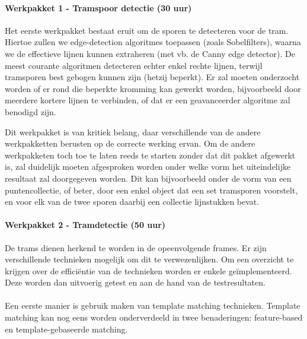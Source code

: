 \documentclass[a4paper,oneside,11pt,final]{memoir}
\begin{document}

\paragraph{Werkpakket 1 - Tramspoor detectie (30 uur)}

Het eerste werkpakket bestaat eruit om de sporen te detecteren voor de tram. Hiertoe zullen we edge-detection algoritmes toepassen (zoals Sobelfilters), waarna we de effectieve lijnen kunnen extraheren (met vb. de Canny edge detector). De meest courante algoritmen detecteren echter enkel rechte lijnen, terwijl tramsporen best gebogen kunnen zijn (hetzij beperkt). Er zal moeten onderzocht worden of er rond die beperkte kromming kan gewerkt worden, bijvoorbeeld door meerdere kortere lijnen te verbinden, of dat er een geavanceerder algoritme zal benodigd zijn.

Dit werkpakket is van kritiek belang, daar verschillende van de andere werkpakketten berusten op de correcte werking ervan. Om de andere werkpakketen toch toe te laten reeds te starten zonder dat dit pakket afgewerkt is, zal duidelijk moeten afgesproken worden onder welke vorm het uiteindelijke resultaat zal doorgegeven worden. Dit kan bijvoorbeeld onder de vorm van een puntencollectie, of beter, door een enkel object dat een set tramsporen voorstelt, en voor elk van de twee sporen daarbij een collectie lijnstukken bevat.

\paragraph{Werkpakket 2 - Tramdetectie (50 uur)}
De trams dienen herkend te worden in de opeenvolgende frames. Er zijn verschillende technieken mogelijk om dit te verwezenlijken. Om een overzicht te krijgen over de efficiëntie van de technieken worden er enkele geïmplementeerd. Deze worden dan uitvoerig getest en aan de hand van de testresultaten.
\\\\
Een eerste manier is gebruik maken van template matching technieken.
Template matching kan nog eens worden onderverdeeld in twee benaderingen: feature-based en template-gebaseerde matching. 
\end{document}
